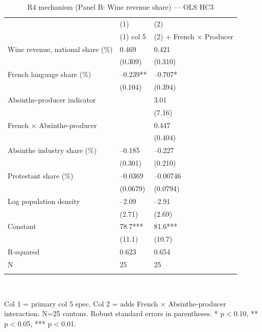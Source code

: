 \begin{table}[tbp] \centering
{}

\caption{R4 mechanism (Panel B: Wine revenue share) --- OLS HC3}
\label{tab:T5_X3}
\begin{tabularx}{\linewidth}{@{}lCC@{}}

\toprule
&{(1)}&{(2)} \tabularnewline
 & (1) col 5 & (2) + French $\times$ Producer \tabularnewline 
\midrule \addlinespace[\belowrulesep]
Wine revenue, national share (\%)&0.469&0.421 \tabularnewline
&(0.309)&(0.310) \tabularnewline
French language share (\%)&--0.239**&--0.707* \tabularnewline
&(0.104)&(0.394) \tabularnewline
Absinthe-producer indicator&&3.01 \tabularnewline
&&(7.16) \tabularnewline
French $\times$ Absinthe-producer&&0.447 \tabularnewline
&&(0.404) \tabularnewline
Absinthe industry share (\%)&--0.185&--0.227 \tabularnewline
&(0.301)&(0.210) \tabularnewline
Protestant share (\%)&--0.0369&--0.00746 \tabularnewline
&(0.0679)&(0.0794) \tabularnewline
Log population density&--2.09&--2.91 \tabularnewline
&(2.71)&(2.69) \tabularnewline
Constant&78.7***&81.6*** \tabularnewline
&(11.1)&(10.7) \tabularnewline
\midrule R-squared&0.623&0.654 \tabularnewline
N&25&25 \tabularnewline
\bottomrule \addlinespace[\belowrulesep]

\end{tabularx}
\\ \parbox{\linewidth}{\footnotesize Col 1 = primary col 5 spec. Col 2 = adds French $\times$ Absinthe-producer interaction. N=25 cantons. Robust standard errors in parentheses. * p\(<\)0.10, ** p\(<\)0.05, *** p\(<\)0.01.}
\end{table}

